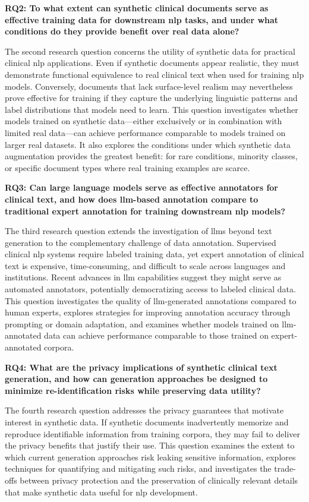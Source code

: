\textbf{RQ2: To what extent can synthetic clinical documents serve as effective training data for downstream \gls{nlp} tasks, and under what conditions do they provide benefit over real data alone?}

The second research question concerns the utility of synthetic data for practical clinical \gls{nlp} applications. Even if synthetic documents appear realistic, they must demonstrate functional equivalence to real clinical text when used for training \gls{nlp} models.
Conversely, documents that lack surface-level realism may nevertheless prove effective for training if they capture the underlying linguistic patterns and label distributions that models need to learn. This question investigates whether models trained on synthetic data---either exclusively or in combination with limited real data---can achieve performance comparable to models trained on larger real datasets. It also explores the conditions under which synthetic data augmentation provides the greatest benefit: for rare conditions, minority classes, or specific document types where real training examples are scarce.

\textbf{RQ3: Can large language models serve as effective annotators for clinical text, and how does \gls{llm}-based annotation compare to traditional expert annotation for training downstream \gls{nlp} models?}

The third research question extends the investigation of \glspl{llm} beyond text generation to the complementary challenge of data annotation. Supervised clinical \gls{nlp} systems require labeled training data, yet expert annotation of clinical text is expensive, time-consuming, and difficult to scale across languages and institutions. Recent advances in \gls{llm} capabilities suggest they might serve as automated annotators, potentially democratizing access to labeled clinical data. This question investigates the quality of \gls{llm}-generated annotations compared to human experts, explores strategies for improving annotation accuracy through prompting or domain adaptation, and examines whether models trained on \gls{llm}-annotated data can achieve performance comparable to those trained on expert-annotated corpora.

\textbf{RQ4: What are the privacy implications of synthetic clinical text generation, and how can generation approaches be designed to minimize re-identification risks while preserving data utility?}

The fourth research question addresses the privacy guarantees that motivate interest in synthetic data. If synthetic documents inadvertently memorize and reproduce identifiable information from training corpora, they may fail to deliver the privacy benefits that justify their use. This question examines the extent to which current generation approaches risk leaking sensitive information, explores techniques for quantifying and mitigating such risks, and investigates the trade-offs between privacy protection and the preservation of clinically relevant details that make synthetic data useful for \gls{nlp} development.
